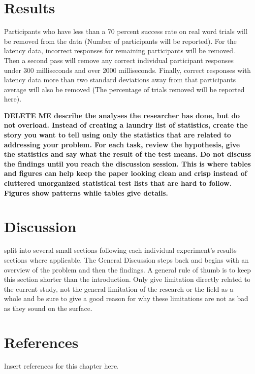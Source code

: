 \section{Results}

Participants who have less than a 70 percent success rate on real word trials will be removed from the data (Number of participants will be reported). For the latency data, incorrect responses for remaining participants will be removed. Then a second pass will remove any correct individual participant responses under 300 milliseconds and over 2000 milliseconds. Finally, correct responses with latency data more than two standard deviations away from that participants average will also be removed (The percentage of trials removed will be reported here).

\textbf{DELETE ME describe the analyses the researcher has done, but do not overload. Instead of creating a laundry list of statistics, create the story you want to tell using only the statistics that are related to addressing your problem. 
For each task, review the hypothesis, give the statistics and say what the result of the test means. 
Do not discuss the findings until you reach the discussion session. 
This is where tables and figures can help keep the paper looking clean and crisp instead of cluttered unorganized statistical test lists that are hard to follow. 
Figures show patterns while tables give details.}



\section{Discussion}

split into several small sections following each individual experiment’s results sections where applicable. 
The General Discussion steps back and begins with an overview of the problem and then the findings. A general rule of thumb is to keep this section shorter than the introduction. Only give limitation directly related to the current study, not the general limitation of the research or the field as a whole and be sure to give a good reason for why these limitations are not as bad as they sound on the surface.



\section{References}

Insert references for this chapter here.